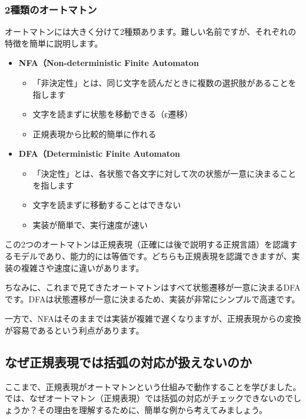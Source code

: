 \subsubsection{2種類のオートマトン}

オートマトンには大きく分けて2種類あります。難しい名前ですが、それぞれの特徴を簡単に説明します。

\begin{itemize}
\item
  \textbf{\sffamily NFA（Non-deterministic Finite
  Automaton}

  \begin{itemize}
  \item
    「非決定性」とは、同じ文字を読んだときに複数の選択肢があることを指します
  \item
    文字を読まずに状態を移動できる（ε遷移）
  \item
    正規表現から比較的簡単に作れる
  \end{itemize}
\item
  \textbf{\sffamily DFA（Deterministic Finite Automaton}

  \begin{itemize}
  \item
    「決定性」とは、各状態で各文字に対して次の状態が一意に決まることを指します
  \item
    文字を読まずに移動することはできない
  \item
    実装が簡単で、実行速度が速い
  \end{itemize}
\end{itemize}

この2つのオートマトンは正規表現（正確には後で説明する正規言語）を認識するモデルであり、能力的には等価です。どちらも正規表現を認識できますが、実装の複雑さや速度に違いがあります。

ちなみに、これまで見てきたオートマトンはすべて状態遷移が一意に決まるDFAです。DFAは状態遷移が一意に決まるため、実装が非常にシンプルで高速です。

一方で、NFAはそのままでは実装が複雑で遅くなりますが、正規表現からの変換が容易であるという利点があります。

\subsection{なぜ正規表現では括弧の対応が扱えないのか}

ここまで、正規表現がオートマトンという仕組みで動作することを学びました。では、なぜオートマトン（正規表現）では括弧の対応がチェックできないのでしょうか？その理由を理解するために、簡単な例から考えてみましょう。

